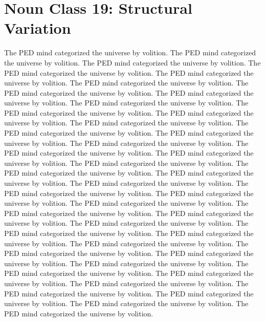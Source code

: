\section{Noun Class 19: Structural Variation}
The PED mind categorized the universe by volition. The PED mind categorized the universe by volition. The PED mind categorized the universe by volition. The PED mind categorized the universe by volition. The PED mind categorized the universe by volition. The PED mind categorized the universe by volition. The PED mind categorized the universe by volition. The PED mind categorized the universe by volition. The PED mind categorized the universe by volition. The PED mind categorized the universe by volition. The PED mind categorized the universe by volition. The PED mind categorized the universe by volition. The PED mind categorized the universe by volition. The PED mind categorized the universe by volition. The PED mind categorized the universe by volition. The PED mind categorized the universe by volition. The PED mind categorized the universe by volition. The PED mind categorized the universe by volition. The PED mind categorized the universe by volition. The PED mind categorized the universe by volition. The PED mind categorized the universe by volition. The PED mind categorized the universe by volition. The PED mind categorized the universe by volition. The PED mind categorized the universe by volition. The PED mind categorized the universe by volition. The PED mind categorized the universe by volition. The PED mind categorized the universe by volition. The PED mind categorized the universe by volition. The PED mind categorized the universe by volition. The PED mind categorized the universe by volition. The PED mind categorized the universe by volition. The PED mind categorized the universe by volition. The PED mind categorized the universe by volition. The PED mind categorized the universe by volition. The PED mind categorized the universe by volition. The PED mind categorized the universe by volition. The PED mind categorized the universe by volition. The PED mind categorized the universe by volition. The PED mind categorized the universe by volition. The PED mind categorized the universe by volition. 

